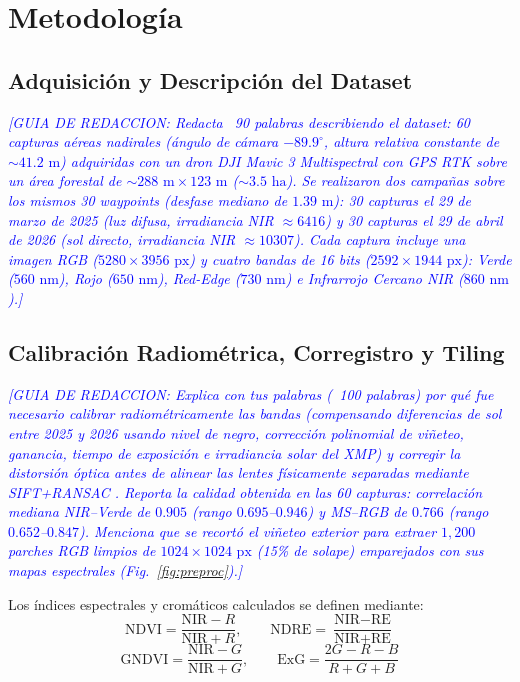 \documentclass[conference]{IEEEtran}
\newcommand{\guia}[1]{\textcolor{blue}{\textit{[GUIA DE REDACCION: #1]}}}
\begin{document}
\section{Metodología}

\subsection{Adquisición y Descripción del Dataset}
\guia{Redacta ~90 palabras describiendo el dataset: 60 capturas aéreas nadirales (ángulo de cámara $-89.9^\circ$, altura relativa constante de $\sim 41.2\text{ m}$) adquiridas con un dron DJI Mavic 3 Multispectral con GPS RTK sobre un área forestal de $\sim 288\text{ m} \times 123\text{ m}$ ($\sim 3.5\text{ ha}$). Se realizaron dos campañas sobre los mismos 30 waypoints (desfase mediano de $1.39\text{ m}$): 30 capturas el 29 de marzo de 2025 (luz difusa, irradiancia NIR $\approx 6416$) y 30 capturas el 29 de abril de 2026 (sol directo, irradiancia NIR $\approx 10307$). Cada captura incluye una imagen RGB ($5280 \times 3956\text{ px}$) y cuatro bandas de 16 bits ($2592 \times 1944\text{ px}$): Verde ($560\text{ nm}$), Rojo ($650\text{ nm}$), Red-Edge ($730\text{ nm}$) e Infrarrojo Cercano NIR ($860\text{ nm}$).}

\subsection{Calibración Radiométrica, Corregistro y Tiling}
\guia{Explica con tus palabras (~100 palabras) por qué fue necesario calibrar radiométricamente las bandas (compensando diferencias de sol entre 2025 y 2026 usando nivel de negro, corrección polinomial de viñeteo, ganancia, tiempo de exposición e irradiancia solar del XMP) y corregir la distorsión óptica antes de alinear las lentes físicamente separadas mediante SIFT+RANSAC \cite{lowe2004sift,fischler1981ransac}. Reporta la calidad obtenida en las 60 capturas: correlación mediana NIR--Verde de $0.905$ (rango $0.695$--$0.946$) y MS--RGB de $0.766$ (rango $0.652$--$0.847$). Menciona que se recortó el viñeteo exterior para extraer $1{,}200$ parches RGB limpios de $1024 \times 1024\text{ px}$ (15\% de solape) emparejados con sus mapas espectrales (Fig.~\ref{fig:preproc}).}

Los índices espectrales y cromáticos calculados se definen mediante:
\begin{equation}
\text{NDVI} = \frac{\text{NIR} - R}{\text{NIR} + R}, \qquad
\text{NDRE} = \frac{\text{NIR} - \text{RE}}{\text{NIR} + \text{RE}}
\label{eq:ndvi_ndre}
\end{equation}
\begin{equation}
\text{GNDVI} = \frac{\text{NIR} - G}{\text{NIR} + G}, \qquad
\text{ExG} = \frac{2G - R - B}{R + G + B}
\label{eq:gndvi_exg}
\end{equation}
\end{document}
